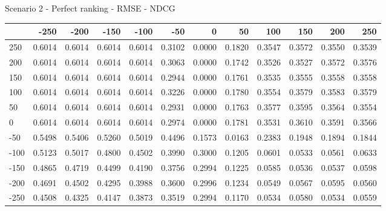 Scenario 2 - Perfect ranking - RMSE - NDCG
\begin{tabular}{lrrrrrrrrrrr}
\toprule
{} &   -250 &   -200 &   -150 &   -100 &   -50  &    0   &    50  &    100 &    150 &    200 &    250 \\
\midrule
 250 & 0.6014 & 0.6014 & 0.6014 & 0.6014 & 0.3102 & 0.0000 & 0.1820 & 0.3547 & 0.3572 & 0.3550 & 0.3539 \\
 200 & 0.6014 & 0.6014 & 0.6014 & 0.6014 & 0.3063 & 0.0000 & 0.1742 & 0.3526 & 0.3527 & 0.3572 & 0.3576 \\
 150 & 0.6014 & 0.6014 & 0.6014 & 0.6014 & 0.2944 & 0.0000 & 0.1761 & 0.3535 & 0.3555 & 0.3558 & 0.3558 \\
 100 & 0.6014 & 0.6014 & 0.6014 & 0.6014 & 0.3226 & 0.0000 & 0.1780 & 0.3554 & 0.3579 & 0.3583 & 0.3579 \\
 50  & 0.6014 & 0.6014 & 0.6014 & 0.6014 & 0.2931 & 0.0000 & 0.1763 & 0.3577 & 0.3595 & 0.3564 & 0.3554 \\
 0   & 0.6014 & 0.6014 & 0.6014 & 0.6014 & 0.2974 & 0.0000 & 0.1781 & 0.3531 & 0.3610 & 0.3591 & 0.3566 \\
-50  & 0.5498 & 0.5406 & 0.5260 & 0.5019 & 0.4496 & 0.1573 & 0.0163 & 0.2383 & 0.1948 & 0.1894 & 0.1844 \\
-100 & 0.5123 & 0.5017 & 0.4800 & 0.4502 & 0.3990 & 0.3000 & 0.1205 & 0.0601 & 0.0533 & 0.0561 & 0.0633 \\
-150 & 0.4865 & 0.4719 & 0.4499 & 0.4190 & 0.3756 & 0.2994 & 0.1225 & 0.0585 & 0.0536 & 0.0537 & 0.0598 \\
-200 & 0.4691 & 0.4502 & 0.4295 & 0.3988 & 0.3600 & 0.2996 & 0.1234 & 0.0549 & 0.0567 & 0.0595 & 0.0560 \\
-250 & 0.4508 & 0.4325 & 0.4147 & 0.3873 & 0.3519 & 0.2994 & 0.1170 & 0.0534 & 0.0580 & 0.0534 & 0.0559 \\
\bottomrule
\end{tabular}

